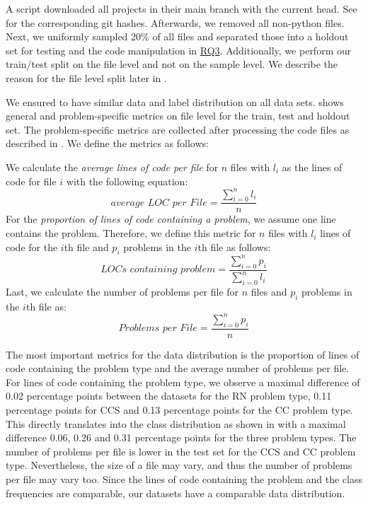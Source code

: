 A script downloaded all projects in their main branch with the current head. See  for the corresponding git hashes. Afterwards, we removed all non-python files. 
Next, we uniformly sampled 20\% of all files and separated those into a holdout set for testing and the code manipulation in \hyperref[rq:3]{RQ3}. Additionally, we perform our train/test split on the file level and not on the sample level. We describe the reason for the file level split later in .

We ensured to have similar data and label distribution on all data sets.  shows general and problem-specific metrics on file level for the train, test and holdout set. The problem-specific metrics are collected after processing the code files as described in . We define the metrics as follows:

We calculate the \textit{average lines of code per file} for $n$ files with $l_i$ as the lines of code for file $i$ with the following equation:
\[
  \textit{average LOC per File} = \frac{\sum_{i=0}^n{l_i}}{n}  
\]
For the \textit{proportion of lines of code containing a problem}, we assume one line contains the problem. Therefore, we define this metric for $n$ files with $l_i$ lines of code for the $i$th file and $p_i$ problems in the $i$th file as follows:
\[
    \textit{LOCs containing problem} = \frac{\sum_{i=0}^n{p_i}}{\sum_{i=0}^n{l_i}}
\]
Last, we calculate the number of problems per file for $n$ files and $p_i$ problems in the $i$th file as:
\[
    \textit{Problems per File} = \frac{\sum_{i=0}^n{p_i}}{n}
\]

The most important metrics for the data distribution is the proportion of lines of code containing the problem type and the average number of problems per file. For lines of code containing the problem type, we observe a maximal difference of 0.02 percentage points between the datasets for the RN problem type, 0.11 percentage points for CCS and 0.13 percentage points for the CC problem type. This directly translates into the class distribution as shown in  with a maximal difference 0.06, 0.26 and 0.31 percentage points for the three problem types.
The number of problems per file is lower in the test set for the CCS and CC problem type. Nevertheless, the size of a file may vary, and thus the number of problems per file may vary too. Since the lines of code containing the problem and the class frequencies are comparable, our datasets have a comparable data distribution.


